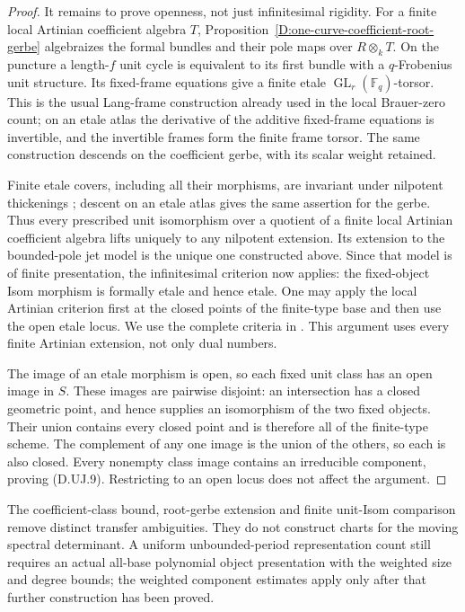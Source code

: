\begin{proof}
It remains to prove openness, not just infinitesimal
rigidity. For a finite local Artinian coefficient algebra
$T$, Proposition~\ref{D:one-curve-coefficient-root-gerbe}
algebraizes the formal bundles and their pole maps over
$R\otimes_kT$. On the puncture a length-$f$ unit cycle is
equivalent to its first bundle with a $q$-Frobenius unit
structure. Its fixed-frame equations give a finite etale
$\operatorname{GL}_r(\mathbb F_q)$-torsor. This is the
usual Lang-frame construction already used in the local
Brauer-zero count; on an etale atlas the derivative of
the additive fixed-frame equations is invertible, and the
invertible frames form the finite frame torsor. The same
construction descends on the coefficient gerbe, with its
scalar weight retained.

Finite etale covers, including all their morphisms, are
invariant under nilpotent thickenings
\citep[Lemma~58.8.3 and complete proof, Tag~0BQB]
{StacksUnitJetTransferD}; descent on an etale atlas gives
the same assertion for the gerbe. Thus every prescribed
unit isomorphism over a quotient of a finite local Artinian
coefficient algebra lifts uniquely to any nilpotent
extension. Its extension to the bounded-pole jet model is
the unique one constructed above. Since that model is of
finite presentation, the infinitesimal criterion now
applies: the fixed-object Isom morphism is formally etale
and hence etale. One may apply the local Artinian criterion
first at the closed points of the finite-type base and
then use the open etale locus. We use the complete
criteria in \citep[Tags~02HT, 02HM and 00UR]
{StacksUnitJetTransferD}. This argument uses every finite
Artinian extension, not only dual numbers.

The image of an etale morphism is open, so each fixed
unit class has an open image in $S$. These images are
pairwise disjoint: an intersection has a closed geometric
point, and hence supplies an isomorphism of the two fixed
objects. Their union contains every closed point and is
therefore all of the finite-type scheme. The complement
of any one image is the union of the others, so each is
also closed. Every nonempty class image contains an
irreducible component, proving (D.UJ.9). Restricting to
an open locus does not affect the argument.
\end{proof}

\begin{remark}
The coefficient-class bound, root-gerbe extension and finite
unit-Isom comparison remove distinct transfer ambiguities.
They do not construct charts for the moving spectral
determinant. A uniform unbounded-period representation count
still requires an actual all-base polynomial object
presentation with the weighted size and degree bounds; the
weighted component estimates apply only after that further
construction has been proved.
\end{remark}
